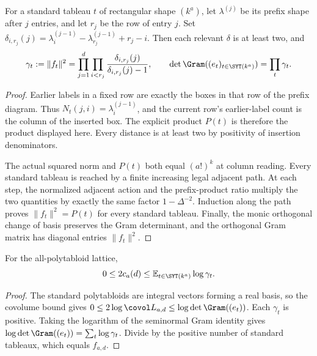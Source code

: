 \begin{lemma}
\label{lem:seminormal-norms}
\leanok
For a standard tableau $t$ of rectangular shape $(k^a)$, let $\lambda^{(j)}$ be its prefix shape
after $j$ entries, and let $r_j$ be the row of entry $j$. Set
$\delta_{i,r_j}(j)=\lambda_i^{(j-1)}-\lambda_{r_j}^{(j-1)}+r_j-i$.
Then each relevant $\delta$ is at least two, and
\[
 \gamma_t:=\|f_t\|^2
 =\prod_{j=1}^d\prod_{i<r_j}\frac{\delta_{i,r_j}(j)}{\delta_{i,r_j}(j)-1},
 \qquad
 \det\Gram((e_t)_{t\in\SYT(k^a)})=\prod_t\gamma_t.
\]
\end{lemma}
\begin{proof}
Earlier labels in a fixed row are exactly the boxes in that row of the
prefix diagram. Thus $N_t(j,i)=\lambda_i^{(j-1)}$, and the current
row's earlier-label count is the column of the inserted box. The
explicit product $P(t)$ is therefore the product displayed here.
Every distance is at least two by positivity of insertion denominators.

The actual squared norm and $P(t)$ both equal $(a!)^k$ at column
reading. Every standard tableau is reached by a finite increasing
legal adjacent path. At each step, the normalized adjacent action
and the prefix-product ratio multiply the two quantities by exactly
the same factor $1-\Delta^{-2}$. Induction along the path proves
$\|f_t\|^2=P(t)$ for every standard tableau. Finally, the monic
orthogonal change of basis preserves the Gram determinant, and the
orthogonal Gram matrix has diagonal entries $\|f_t\|^2$.
\end{proof}

\begin{lemma}
\label{lem:seminormal-covolume}
\leanok
For the all-polytabloid lattice,
\[
 0\leq2c_a(d)\leq\mathbb E_{t\in\SYT(k^a)}\log\gamma_t.
\]
\end{lemma}
\begin{proof}
The standard polytabloids are integral vectors forming a real basis,
so the covolume bound gives $0\leq2\log\covol L_{a,d}\leq
\log\det\Gram((e_t))$. Each $\gamma_t$ is positive. Taking the
logarithm of the seminormal Gram identity gives
$\log\det\Gram((e_t))=\sum_t\log\gamma_t$. Divide by the
positive number of standard tableaux, which equals $f_{a,d}$.
\end{proof}

